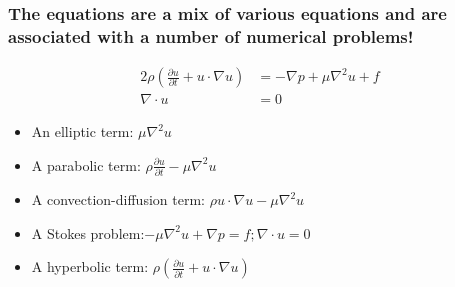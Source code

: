 \begin{frame} 
\frametitle{
  The equations are a mix of various equations and are associated with
  a number of numerical problems!}
  \linespread{1.5} 
  \begin{alignat*}{2} \rho (\frac{\partial u}{\partial t} + u \cdot \nabla u)
    &=  -\nabla p  + \mu \nabla^2 u + f   \\
    \nabla \cdot u &= 0  
  \end{alignat*}
  \begin{itemize}
  \item 
  An elliptic term: $\mu \nabla^2 u$ 
  \item
  A parabolic term: $\rho \frac{\partial u}{\partial t} - \mu \nabla^2 u$   
  \item 
  A convection-diffusion term: $\rho u \cdot \nabla u - \mu \nabla^2 u$   
  \item 
  A Stokes problem:$ - \mu \nabla^2 u + \nabla p = f;  \nabla \cdot u =  0$ 
  \item 
  A hyperbolic term: 
  $\rho (\frac{\partial u}{\partial t} + u \cdot \nabla u)$  
  \end{itemize}


\end{frame}
